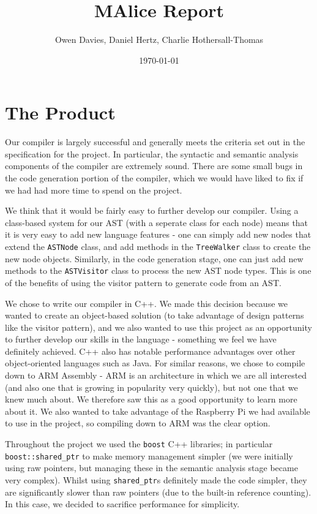 \documentclass[11pt, notitlepage]{report}
\begin{document}
\title{MAlice Report}
\author{Owen Davies, Daniel Hertz, Charlie Hothersall-Thomas}
\date{\today}

\maketitle

\section*{The Product}
Our compiler is largely successful and generally meets the criteria set out in the specification for the project. In particular, the syntactic and semantic analysis components of the compiler are extremely sound. There are some small bugs in the code generation portion of the compiler, which we would have liked to fix if we had had more time to spend on the project.

We think that it would be fairly easy to further develop our compiler. Using a class-based system for our AST (with a seperate class for each node) means that it is very easy to add new language features - one can simply add new nodes that extend the \texttt{ASTNode} class, and add methods in the \texttt{TreeWalker} class to create the new node objects. Similarly, in the code generation stage, one can just add new methods to the \texttt{ASTVisitor} class to process the new AST node types. This is one of the benefits of using the visitor pattern to generate code from an AST.

We chose to write our compiler in C++. We made this decision because we wanted to create an object-based solution (to take advantage of design patterns like the visitor pattern), and we also wanted to use this project as an opportunity to further develop our skills in the language - something we feel we have definitely achieved. C++ also has notable performance advantages over other object-oriented languages such as Java. For similar reasons, we chose to compile down to ARM Assembly - ARM is an architecture in which we are all interested (and also one that is growing in popularity very quickly), but not one that we knew much about. We therefore saw this as a good opportunity to learn more about it. We also wanted to take advantage of the Raspberry Pi we had available to use in the project, so compiling down to ARM was the clear option.

Throughout the project we used the \texttt{boost} C++ libraries; in particular \texttt{boost::shared\_ptr} to make memory management simpler (we were initially using raw pointers, but managing these in the semantic analysis stage became very complex). Whilst using \texttt{shared\_ptr}s definitely made the code simpler, they are significantly slower than raw pointers (due to the built-in reference counting). In this case, we decided to sacrifice performance for simplicity.
\end{document}
